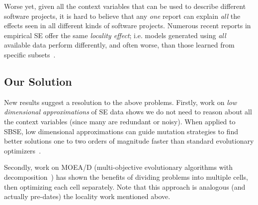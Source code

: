 Worse yet, given all the context variables that can
be used to describe different software projects, it
is hard to believe that any {\em one} report can
explain {\em all} the effects seen in all different
kinds of software projects. Numerous recent reports
in empirical SE offer the same {\em locality
effect}; i.e. models generated using {\em all}
available data perform differently, and often worse, than
those learned from specific subsets~\cite{posnet11,betta12,me12d,yang13,emse12}.

\subsection{Our Solution}

New results suggest a resolution to the above
problems.  Firstly, work on {\em low dimensional
  approximations} of SE data shows we do not
need to reason about all the context variables
(since many are redundant or noisy). When applied to
SBSE, low dimensional approximations can
guide mutation strategies to find
better solutions one to two orders of magnitude
faster than standard evolutionary
optimizers~\cite{krall14,krall14b}.

Secondly, work on MOEA/D (multi-objective
evolutionary algorithms with decomposition~\cite{zhang07:TEC}) has
shown the benefits of dividing  problems into multiple cells, then 
optimizing each cell separately.  Note
that this approach is analogous (and actually
pre-dates) the locality work mentioned above.

